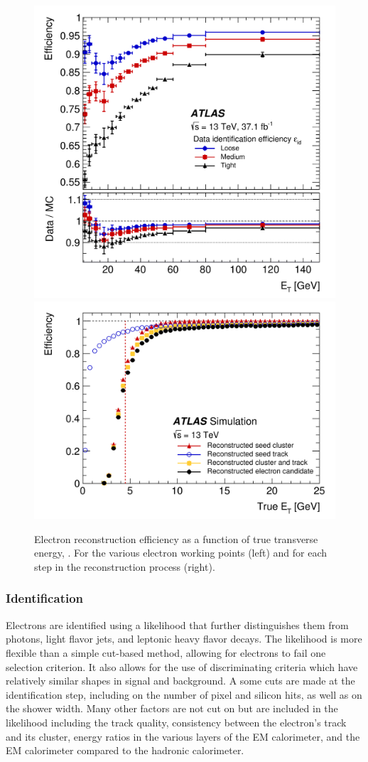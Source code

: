 \begin{figure}[htbp]
\centering
\includegraphics[width=.4\textwidth]{figures/EventReconstruction/elec-reco.png}
\includegraphics[width=.5\textwidth]{figures/EventReconstruction/elec-reco-steps.png}
\caption{Electron reconstruction efficiency as a function of true transverse energy, \et. For the various electron working points (left) and for each step in the reconstruction process (right).}
\label{fig:elec_gsf}
\end{figure}

\subsubsection{Identification}

Electrons are identified using a likelihood that further distinguishes them from photons, light flavor jets, and leptonic heavy flavor decays. The likelihood is more flexible than a simple cut-based method, allowing for electrons to fail one selection criterion. It also allows for the use of discriminating criteria which have relatively similar shapes in signal and background. A some cuts are made at the identification step, including on the number of pixel and silicon hits, as well as on the shower width. Many other factors are not cut on but are included in the likelihood including the track quality, consistency between the electron's track and its cluster, energy ratios in the various layers of the \ac{EM} calorimeter, and the \ac{EM} calorimeter compared to the hadronic calorimeter.


